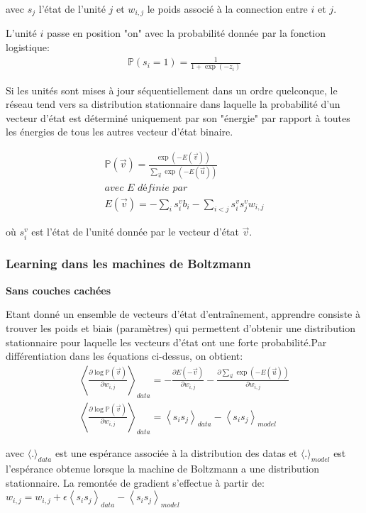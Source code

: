 \documentclass{article}
\begin{document}
\noindent avec $s_j$ l'état de l'unité $j$ et $w_{i,j}$ le poids associé à la connection entre $i$ et $j$.

\noindent L'unité $i$ passe en position "on" avec la probabilité donnée par la fonction logistique:
\begin{align*}
\mathbb{P}(s_i=1)=\frac{1}{1+\exp(-z_i)}
\end{align*}

\noindent Si les unités sont mises à jour séquentiellement dans un ordre quelconque, le réseau tend vers sa distribution stationnaire dans laquelle la probabilité d'un vecteur d'état est déterminé uniquement par son "énergie" par rapport à toutes les énergies de tous les autres vecteur d'état binaire.

\begin{align*}
\mathbb{P}(\vec{v})=\frac{\exp(-E(\vec{v}))}{\sum_{\vec{u}} \exp(-E(\vec{u}))}\\
\textit{avec E définie par}\\
E(\vec{v})=-\sum_i s_i^{v} b_i-\sum_{i < j} s_i^{v} s_j^{v} w_{i,j}
\end{align*}

\noindent où $s_i^v$ est l'état de l'unité donnée par le vecteur d'état $\vec{v}$.

\subsubsection{Learning dans les machines de Boltzmann}

\textbf{Sans couches cachées}

\noindent Etant donné un ensemble de vecteurs d'état d'entraînement, apprendre consiste à trouver les poids et biais (paramètres) qui permettent d'obtenir une distribution stationnaire pour laquelle les vecteurs d'état ont une forte probabilité.Par différentiation dans les équations ci-dessus, on obtient:
\begin{align*}
\left\langle\frac{\partial \log \mathbb{P}(\vec{v})}{\partial w_{i,j}}\right\rangle_{data}=-\frac{\partial E(-\vec{v})}{\partial w_{i,j}}-\frac{\partial\sum_{\vec{u}} \exp(-E(\vec{u}))}{\partial w_{i,j}}\\
\left\langle\frac{\partial \log \mathbb{P}(\vec{v})}{\partial w_{i,j}}\right\rangle_{data}=\left\langle s_is_j\right\rangle_{data}-\left\langle s_is_j\right\rangle_{model}
\end{align*}

\noindent avec $\langle.\rangle_{data}$ est une espérance associée à la distribution des datas et $\langle.\rangle_{model}$ est l'espérance obtenue lorsque la machine de Boltzmann a une distribution stationnaire. La remontée de gradient s'effectue à partir de:
$w_{i,j}=w_{i,j}+\epsilon \left\langle s_is_j\right\rangle_{data}-\left\langle s_is_j\right\rangle_{model}$
\end{document}
